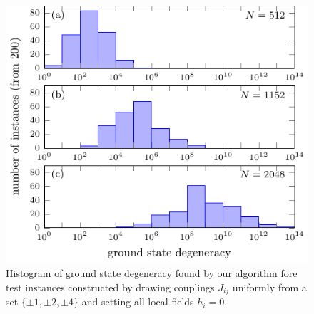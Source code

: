 \begin{figure}
  \includegraphics[width=\textwidth]{figures/tn-ground-degeneracy.pdf}
  \caption{Histogram of ground state degeneracy found by our algorithm fore test instances constructed by
    drawing couplings $J_{ij}$ uniformly from a set $\{\pm 1, \pm 2, \pm 4\}$ and
    setting all local fields $h_{i} = 0$.}
  \label{fig:ground-degeneracy}
\end{figure}
